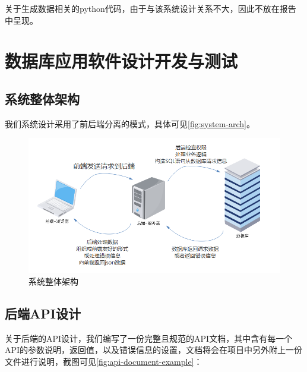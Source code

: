 \documentclass{myreport}
\begin{document}
关于生成数据相关的python代码，由于与该系统设计关系不大，因此不放在报告中呈现。

\chapter{数据库应用软件设计开发与测试}

\section{系统整体架构}

我们系统设计采用了前后端分离的模式，具体可见\autoref{fig:system-arch}。


\begin{figure}[htp]
    \centering
    \includegraphics[width=13cm]{figure/2018-12-22-12-09-07.png}
    \caption{系统整体架构}
    \label{fig:system-arch}
\end{figure}

\section{后端API设计}


关于后端的API设计，我们编写了一份完整且规范的API文档，其中含有每一个API的参数说明，返回值，以及错误信息的设置，文档将会在项目中另外附上一份文件进行说明，截图可见\autoref{fig:api-document-example}：
\end{document}
